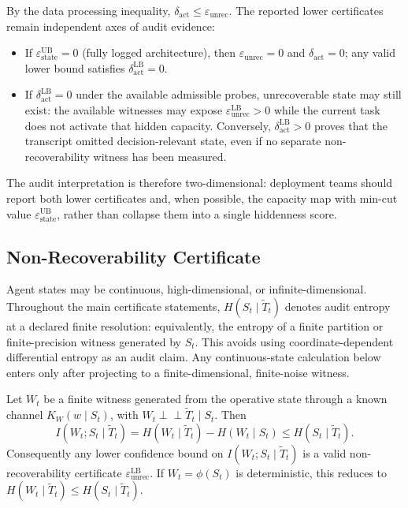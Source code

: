   \begin{remark}
  \label{rem:complementarity}
  By the data processing inequality, $\delta_\text{act} \leq
  \varepsilon_\text{unrec}$. The reported lower certificates remain independent
  axes of audit evidence:
  \begin{itemize}
    \item If $\varepsilon_\text{state}^\text{UB} = 0$ (fully logged
  architecture), then $\varepsilon_\text{unrec} = 0$ and $\delta_\text{act} =
  0$; any valid lower bound satisfies $\delta_\text{act}^\text{LB} = 0$.
    \item If $\delta_\text{act}^\text{LB} = 0$ under the available admissible
  probes, unrecoverable state may still exist: the available witnesses may
  expose $\varepsilon_\text{unrec}^\text{LB}>0$ while the current task does not
  activate that hidden capacity. Conversely,
  $\delta_\text{act}^\text{LB}>0$ proves that the transcript omitted
  decision-relevant state, even if no separate non-recoverability witness has
  been measured.
  \end{itemize}
  The audit interpretation is therefore two-dimensional: deployment teams
  should report both lower certificates and, when possible, the capacity map
  with min-cut value $\varepsilon_\text{state}^\text{UB}$, rather than collapse
  them into a single hiddenness score.
  \end{remark}

  \subsection{Non-Recoverability Certificate}
  \label{sec:unrec-cert}

  \begin{remark}
  \label{rem:finite-precision}
  Agent states may be continuous, high-dimensional, or infinite-dimensional.
  Throughout the main certificate statements, $H(S_t\mid\tilde T_t)$ denotes
  audit entropy at a declared finite resolution: equivalently, the entropy of
  a finite partition or finite-precision witness generated by $S_t$. This avoids
  using coordinate-dependent differential entropy as an audit claim. Any
  continuous-state calculation below enters only after projecting to a
  finite-dimensional, finite-noise witness.
  \end{remark}

  \begin{proposition}
  \label{prop:unrec-lb}
  Let $W_t$ be a finite witness generated from the operative state through a
  known channel $K_W(w\mid S_t)$, with
  $W_t\perp\!\!\!\perp \tilde T_t \mid S_t$. Then
  \[
    I(W_t;S_t\mid\tilde T_t)
    =
    H(W_t\mid\tilde T_t)-H(W_t\mid S_t)
    \leq
    H(S_t\mid\tilde T_t).
  \]
  Consequently any lower confidence bound on
  $I(W_t;S_t\mid\tilde T_t)$ is a valid non-recoverability certificate
  $\varepsilon_\mathrm{unrec}^\mathrm{LB}$. If $W_t=\phi(S_t)$ is deterministic,
  this reduces to $H(W_t\mid\tilde T_t)\leq H(S_t\mid\tilde T_t)$.
  \end{proposition}

